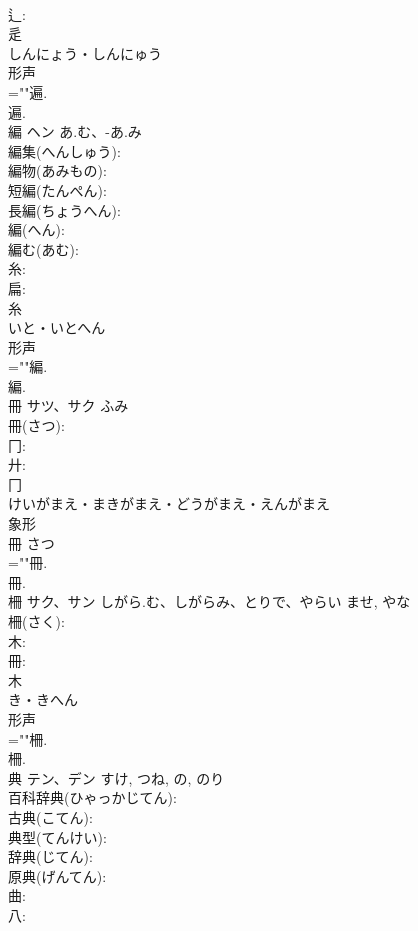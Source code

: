 \documentclass[8pt]{extreport}
\begin{document}
\begin{CJK}{UTF8}{min}
\\	辶: 
\\	辵	
\\	しんにょう・しんにゅう	
\\	形声 
\\	=""遍.
\\	遍.
\\	編	ヘン	あ.む、-あ.み		
\\	編集(へんしゅう): 
\\	編物(あみもの): 
\\	短編(たんぺん): 
\\	長編(ちょうへん): 
\\	編(へん): 
\\	編む(あむ): 
\\	糸: 
\\	扁: 
\\	糸	
\\	いと・いとへん	
\\	形声 
\\	=""編.
\\	編.
\\	冊	サツ、サク	ふみ		
\\	冊(さつ): 
\\	冂: 
\\	廾: 
\\	冂	
\\	けいがまえ・まきがまえ・どうがまえ・えんがまえ	
\\	象形 
\\	冊 さつ 
\\	=""冊.
\\	冊.
\\	柵	サク、サン	しがら.む、しがらみ、とりで、やらい	ませ, やな	
\\	柵(さく): 
\\	木: 
\\	冊: 
\\	木	
\\	き・きへん	
\\	形声 
\\	=""柵.
\\	柵.
\\	典	テン、デン		すけ, つね, の, のり	
\\	百科辞典(ひゃっかじてん): 
\\	古典(こてん): 
\\	典型(てんけい): 
\\	辞典(じてん): 
\\	原典(げんてん): 
\\	曲: 
\\	八: 

\end{CJK}
\end{document}
